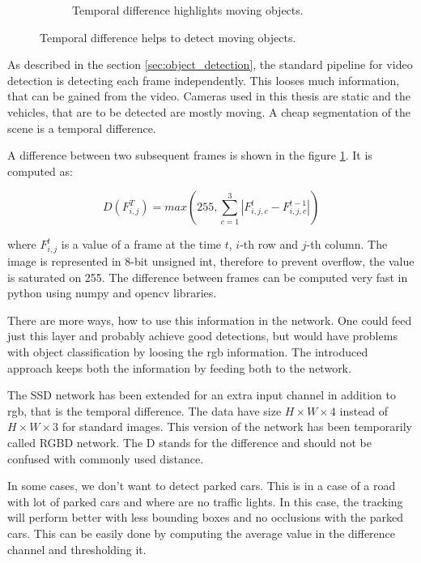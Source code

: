 \documentclass[a4paper,12pt,titlepage]{article}
\numberwithin{figure}{section}
\begin{document}
\begin{figure}
\begin{subfigure}[Sample1]{0.5\linewidth}
        \caption{Temporal difference highlights moving objects.}   
        \label{fig:td_black}
    \end{subfigure}
    \caption{Temporal difference helps to detect moving objects.}
    \label{fig:td}
\end{figure}

As described in the section \ref{sec:object_detection}, the standard pipeline for video detection is detecting each frame independently. This looses much information, that can be gained from the video. Cameras used in this thesis are static and the vehicles, that are to be detected are mostly moving. A cheap segmentation of the scene is a temporal difference. 

A difference between two subsequent frames is shown in the figure \ref{fig:td_black}. It is computed as:

\begin{equation}
D(F^{T}_{i, j}) = max(255, \sum_{c = 1}^3 |F^t_{i, j, c} - F^{t-1}_{i, j, c}|)
\end{equation}

where $F_{i, j}^t$ is a value of a frame at the time $t$, $i$-th row and $j$-th column. The image is represented in 8-bit unsigned int, therefore to prevent overflow, the value is saturated on 255. The difference between frames can be computed very fast in python using numpy\cite{walt2011numpy} and opencv\cite{opencv} libraries. 

There are more ways, how to use this information in the network. One could feed just this layer and probably achieve good detections, but would have problems with object classification by loosing the rgb information. The introduced approach keeps both the information by feeding both to the network.

The SSD network has been extended for an extra input channel in addition to rgb, that is the temporal difference. The data have size $H \times W \times 4$ instead of $H \times W \times 3$ for standard images. This version of the network has been temporarily called RGBD network. The D stands for the difference and should not be confused with commonly used distance.

In some cases, we don't want to detect parked cars. This is in a case of a road with lot of parked cars and where are no traffic lights. In this case, the tracking will perform better with less bounding boxes and no occlusions with the parked cars. This can be easily done by computing the average value in the difference channel and thresholding it.
\end{document}
